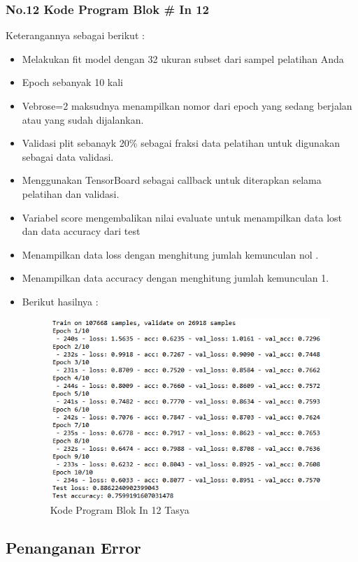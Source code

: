\subsubsection{No.12 Kode Program Blok \# In 12}

Keterangannya sebagai berikut :\\
\begin{itemize}
\item Melakukan fit model dengan 32 ukuran subset dari sampel pelatihan Anda
\item Epoch sebanyak 10 kali
\item Vebrose=2 maksudnya menampilkan nomor dari epoch yang sedang berjalan atau yang sudah dijalankan.
\item Validasi plit sebanayk 20\% sebagai fraksi data pelatihan untuk digunakan sebagai data validasi.
\item Menggunakan TensorBoard sebagai callback untuk diterapkan selama pelatihan dan validasi.
\item Variabel score mengembalikan nilai evaluate untuk menampilkan data lost dan data accuracy dari test
\item Menampilkan data loss dengan menghitung jumlah kemunculan nol .
\item Menampilkan data accuracy dengan menghitung jumlah kemunculan 1.
\item Berikut hasilnya :\\
\begin{figure}[ht]
\centering
\includegraphics[scale=0.5]{figures/Chapter 7/1164086/Praktek/chapter7tasya25.png}
\caption{Kode Program Blok In 12 Tasya}
\label{Praktek}
\end{figure}
\end{itemize}


\subsection{Penanganan Error}
